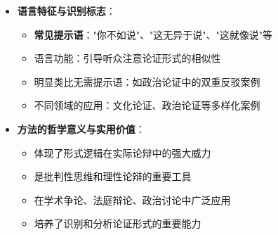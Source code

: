 \begin{center}
{{\begin{itemize}
  \begin{itemize}
  \item \textbf{核心争议点}：形式识别、类比恰当性、相关性判断、语境因素
  \item 方法的重大意义：如果形式确实相同且反驳论证明显糟糕，则原论证被破坏
  \item 方法的局限性：成功完全依赖于形式同构的准确性
  \item 争议的不可避免性：形式同构的判断往往成为辩论焦点
  \end{itemize}
\item \textbf{语言特征与识别标志}：
  \begin{itemize}
  \item \textbf{常见提示语}："你不如说"、"这无异于说"、"这就像说"等
  \item 语言功能：引导听众注意论证形式的相似性
  \item 明显类比无需提示语：如政治论证中的双重反驳案例
  \item 不同领域的应用：文化论证、政治论证等多样化案例
  \end{itemize}
\item \textbf{方法的哲学意义与实用价值}：
  \begin{itemize}
  \item 体现了形式逻辑在实际论辩中的强大威力
  \item 是批判性思维和理性论辩的重要工具
  \item 在学术争论、法庭辩论、政治讨论中广泛应用
  \item 培养了识别和分析论证形式的重要能力
  \end{itemize}
\end{itemize}
}}
\end{center}

